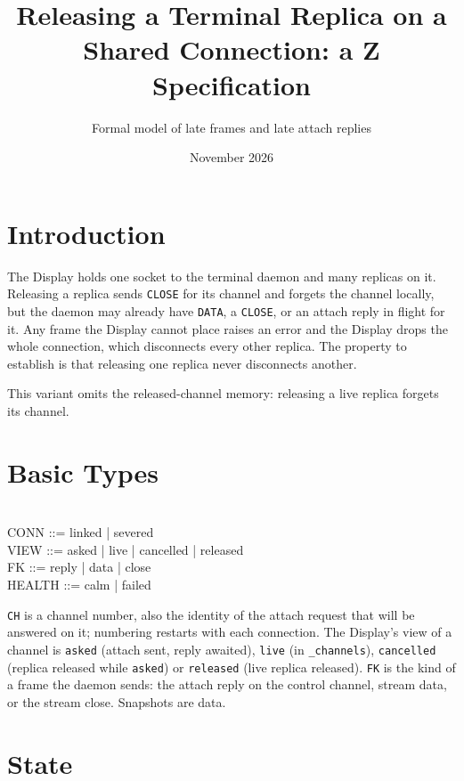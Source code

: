 \documentclass[a4paper,10pt,fleqn]{article}
\begin{document}
\title{Releasing a Terminal Replica on a Shared Connection: a Z Specification}
\author{Formal model of late frames and late attach replies}
\date{November 2026}
\maketitle

\section{Introduction}

The Display holds one socket to the terminal daemon and many replicas on it.
Releasing a replica sends \texttt{CLOSE} for its channel and forgets the
channel locally, but the daemon may already have \texttt{DATA}, a
\texttt{CLOSE}, or an attach reply in flight for it.  Any frame the Display
cannot place raises an error and the Display drops the whole connection, which
disconnects every other replica.  The property to establish is that releasing
one replica never disconnects another.

This variant omits the released-channel memory: releasing a live replica forgets its channel.

\section{Basic Types}

\begin{zed}
  [CH] \\
  CONN ::= linked | severed \\
  VIEW ::= asked | live | cancelled | released \\
  FK ::= reply | data | close \\
  HEALTH ::= calm | failed
\end{zed}

\texttt{CH} is a channel number, also the identity of the attach request that
will be answered on it; numbering restarts with each connection.  The
Display's view of a channel is \texttt{asked} (attach sent, reply awaited),
\texttt{live} (in \texttt{\_channels}), \texttt{cancelled} (replica released
while \texttt{asked}) or \texttt{released} (live replica released).
\texttt{FK} is the kind of a frame the daemon sends: the attach reply on the
control channel, stream data, or the stream close.  Snapshots are data.

\section{State}
\end{document}

